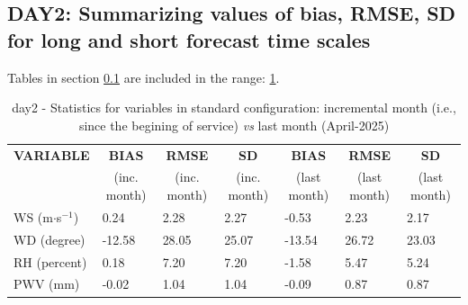 \subsection{DAY2: Summarizing values of bias, RMSE, SD for long and short forecast time scales}\label{subsec:day2:stat}
Tables in section \ref{subsec:day2:stat} are included in the range: \ref{tab:day2:statBEF}.
\begin{table}[h!]
\begin{center}
\begin{tabular}{|l|l|l|l|l|l|l|}
\hline
\multicolumn{1}{|c|}{\cellcolor[HTML]{C0C0C0}\textbf{VARIABLE}} & \multicolumn{1}{c|}{\cellcolor[HTML]{C0C0C0}\textbf{BIAS}} & \multicolumn{1}{c|}{\cellcolor[HTML]{C0C0C0}\textbf{RMSE}} & \multicolumn{1}{c|}{\cellcolor[HTML]{C0C0C0}\textbf{SD}} & \multicolumn{1}{c|}{\cellcolor[HTML]{C0C0C0}\textbf{BIAS}} & \multicolumn{1}{c|}{\cellcolor[HTML]{C0C0C0}\textbf{RMSE}} & \multicolumn{1}{c|}{\cellcolor[HTML]{C0C0C0}\textbf{SD}}\\
\multicolumn{1}{|c|}{\cellcolor[HTML]{C0C0C0}} & \multicolumn{1}{c|}{\cellcolor[HTML]{C0C0C0}(inc. month)} & \multicolumn{1}{c|}{\cellcolor[HTML]{C0C0C0}(inc. month)} & \multicolumn{1}{c|}{\cellcolor[HTML]{C0C0C0}(inc. month)} & \multicolumn{1}{c|}{\cellcolor[HTML]{C0C0C0}(last month)} & \multicolumn{1}{c|}{\cellcolor[HTML]{C0C0C0}(last month)} & \multicolumn{1}{c|}{\cellcolor[HTML]{C0C0C0}(last month)}\\\hline
\cellcolor[HTML]{C0C0C0}WS (m$\cdot$s$^{-1}$) &      0.24  &      2.28  &      2.27  &     -0.53     &      2.23     &      2.17\\
\cellcolor[HTML]{C0C0C0}WD (degree)           &    -12.58  &     28.05  &     25.07  &    -13.54     &     26.72     &     23.03\\
\cellcolor[HTML]{C0C0C0}RH (percent)          &      0.18  &      7.20  &      7.20  &     -1.58     &      5.47     &      5.24\\
\cellcolor[HTML]{C0C0C0}PWV (mm)              &     -0.02 &      1.04 &      1.04 &     -0.09    &      0.87    &      0.87\\
\hline
\end{tabular}
\caption{day2 - Statistics for variables in standard configuration: incremental month (i.e., since the begining of service) \textit{vs} last month (April-2025)}\label{tab:day2:statBEF}
\end{center}
\end{table}

